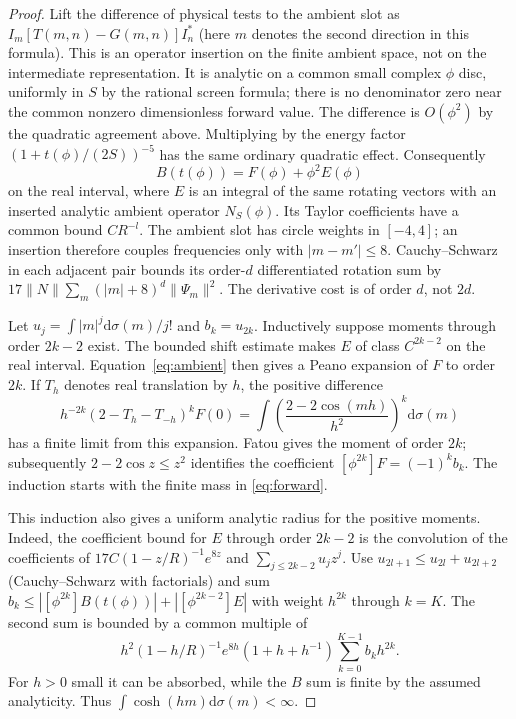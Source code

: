 \documentclass[11pt,a4paper]{article}
\theoremstyle{definition}
\theoremstyle{remark}
\newcommand{\dS}{\mathrm{d}}
\begin{document}
\begin{proof}
Lift the difference of physical tests to the ambient slot as
$I_m[T(m,n)-G(m,n)]I_n^*$ (here $m$ denotes the second direction in this formula). This is an operator insertion on the finite ambient space, not on the intermediate representation. It is analytic on a common small complex $\phi$ disc, uniformly in $S$ by the rational screen formula; there is no denominator zero near the common nonzero dimensionless forward value. The difference is $O(\phi^2)$ by the quadratic agreement above. Multiplying by the energy factor $(1+t(\phi)/(2S))^{-5}$ has the same ordinary quadratic effect. Consequently
\begin{equation}\label{eq:ambient}
 B(t(\phi))=F(\phi)+\phi^2 E(\phi)
\end{equation}
on the real interval, where $E$ is an integral of the same rotating vectors with an inserted analytic ambient operator $N_S(\phi)$. Its Taylor coefficients have a common bound $CR^{-l}$. The ambient slot has circle weights in $[-4,4]$; an insertion therefore couples frequencies only with $|m-m'|\le8$. Cauchy--Schwarz in each adjacent pair bounds its order-$d$ differentiated rotation sum by
$17\|N\|\sum_m (|m|+8)^d\|\Psi_m\|^2$.
The derivative cost is of order $d$, not $2d$.

Let $u_j=\int |m|^j\dS\sigma(m)/j!$ and $b_k=u_{2k}$. Inductively suppose moments through order $2k-2$ exist. The bounded shift estimate makes $E$ of class $C^{2k-2}$ on the real interval. Equation~\eqref{eq:ambient} then gives a Peano expansion of $F$ to order $2k$. If $T_h$ denotes real translation by $h$, the positive difference
\[
 h^{-2k}(2-T_h-T_{-h})^kF(0)
   =\int\left(\frac{2-2\cos(mh)}{h^2}\right)^k\dS\sigma(m)
\]
has a finite limit from this expansion. Fatou gives the moment of order $2k$; subsequently $2-2\cos z\le z^2$ identifies the coefficient $[\phi^{2k}]F=(-1)^kb_k$. The induction starts with the finite mass in \eqref{eq:forward}.

This induction also gives a uniform analytic radius for the positive moments. Indeed, the coefficient bound for $E$ through order $2k-2$ is the convolution of the coefficients of
$17C(1-z/R)^{-1}e^{8z}$ and $\sum_{j\le2k-2}u_jz^j$.
Use $u_{2l+1}\le u_{2l}+u_{2l+2}$ (Cauchy--Schwarz with factorials) and sum
$b_k\le|[\phi^{2k}]B(t(\phi))|+|[\phi^{2k-2}]E|$
with weight $h^{2k}$ through $k=K$. The second sum is bounded by a common multiple of
\[
       h^2(1-h/R)^{-1}e^{8h}(1+h+h^{-1})
                      \sum_{k=0}^{K-1}b_kh^{2k}.
\]
For $h>0$ small it can be absorbed, while the $B$ sum is finite by the assumed analyticity. Thus $\int\cosh(hm)\dS\sigma(m)<\infty$.


\end{proof}
\end{document}
